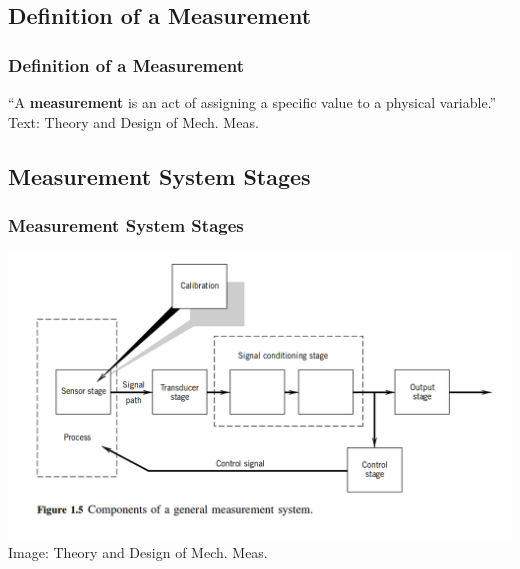 \documentclass[fleqn]{beamer} %
\newcommand{\sectionIsubsectionItitle}{Definition of a Measurement}
\newcommand{\sectionIsubsectionIItitle}{Measurement System Stages}
\begin{document}
		\subsection{\sectionIsubsectionItitle}\label{sectionIsubsectionI}

			\begin{frame}
				\frametitle{\sectionIsubsectionItitle}

				\large{``A {\bf \BL measurement} is an act of assigning a specific value to a physical variable.''} \vspc
				{\tiny Text: Theory and Design of Mech. Meas.}

			\end{frame}

		\subsection{\sectionIsubsectionIItitle}\label{sectionIsubsectionII}

			\begin{frame}
				\frametitle{\sectionIsubsectionIItitle}

				\includegraphics[scale=.325]{images/measurement_stages.png} \\
				{\tiny Image: Theory and Design of Mech. Meas.}
			\end{frame}
\end{document}
